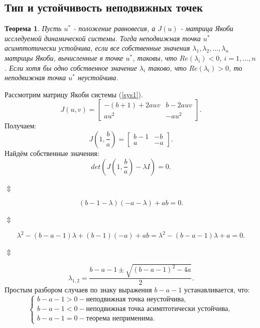 \documentclass[12pt]{article}
\newtheorem{theorem}{Теорема}
\begin{document}
\subsection{Тип и устойчивость неподвижных точек}
\begin{theorem} \label{th1}
    Пусть $u^*$ - положение равновесия, а $J(u)$ - матрица Якоби исследуемой динамической системы. Тогда неподвижная точка $u^*$ асимптотически устойчива, если все собственные значения $\lambda_1, \lambda_2, ..., \lambda_n$ матрицы Якоби, вычисленные в точке $u^*$, таковы, что $Re(\lambda_i) < 0$, $i = 1, ..., n$. Если хотя бы одно собственное значение $\lambda_i$ таково, что $Re(\lambda_i) > 0$, то неподвижная точка $u^*$ неустойчива.
\end{theorem}
Рассмотрим матрицу Якоби системы (\ref{sys1}).
$$
    J(u,v) = 
    \begin{bmatrix}
        -(b+1) + 2auv & b - 2auv \\
        au^2 & -au^2
    \end{bmatrix}.
$$
Получаем:
$$
    J\left(1,\frac{b}{a}\right) = 
    \begin{bmatrix}
        b-1 & -b \\
        a & -a
    \end{bmatrix}.
$$
Найдём собственные значения:
$$
    det\left(J\left(1, \frac{b}{a}\right) - \lambda I\right) = 0.
$$
\begin{center}
    $\Updownarrow$
\end{center}
$$
    (b - 1 - \lambda)(-a-\lambda) + ab = 0.
$$
\begin{center}
    $\Updownarrow$
\end{center}
\begin{equation}\label{characteristic}
    \lambda^2 - (b - a - 1)\lambda + (b-1)(-a) + ab = \lambda^2 - (b - a - 1)\lambda + a = 0.
\end{equation}
\begin{center}
    $\Updownarrow$
\end{center}
\begin{equation}
    \lambda_{1,2} = \frac{b - a - 1 \pm \sqrt{(b - a - 1)^2 - 4a}}{2}.
\end{equation}
Простым разбором случаев по знаку выражения $b - a - 1$ устанавливается, что:
\begin{equation}
    \begin{cases}
        b - a - 1 > 0 - \text{неподвижная точка неустойчива},\\
        b - a - 1 < 0 - \text{неподвижная точка асимптотически устойчива},\\
        b - a - 1 = 0 - \text{теорема неприменима}.
    \end{cases}
\end{equation}
\end{document}
